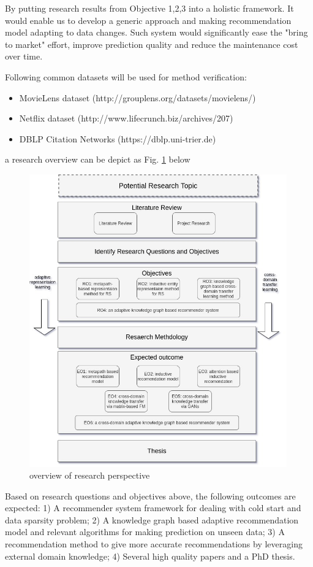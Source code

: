 By putting research results from Objective 1,2,3 into a holistic framework. It would enable us to develop a generic approach and making recommendation model adapting to data changes. Such system would significantly ease the "bring to market" effort, improve prediction quality and reduce the maintenance cost over time. 

Following common datasets will be used for method verification: 

\begin{itemize}

\item MovieLens dataset (http://grouplens.org/datasets/movielens/) 

\item Netflix dataset (http://www.lifecrunch.biz/archives/207) 

\item DBLP Citation Networks (https://dblp.uni-trier.de)  

\end{itemize}

a research overview can be depict as Fig. \ref{fig:r_overview} below
\begin{figure}[!h]
    \centering
    \includegraphics[width=0.99\textwidth]{figs/research_overview.jpg}
    \caption{overview of research perspective}\label{fig:r_overview}
\end{figure}


Based on research questions and objectives above, the following outcomes are expected:
1) A recommender system framework for dealing with cold start and data sparsity problem;
2) A knowledge graph based adaptive recommendation model and relevant algorithms for making prediction on unseen data;
3) A recommendation method to give more accurate recommendations by leveraging external domain knowledge;
4) Several high quality papers and a PhD thesis.
